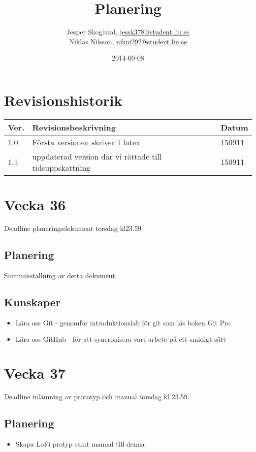 \documentclass{TDP003mall}
\author{Jesper Skoglund, \url{jessk378@student.liu.se}\\
  Niklas Nilsson, \url{nikni292@student.liu.se}}
\title{Planering}
\date{2014-09-08}
\begin{document}
\projectpage
\section{Revisionshistorik}
\begin{table}[!h]
\begin{tabularx}{\linewidth}{|l|X|l|}
\hline
Ver. & Revisionsbeskrivning & Datum \\\hline
1.0 & Första versionen skriven i latex & 150911 \\\hline
1.1 & uppdaterad version där vi rättade till tidsuppskattning & 150911 \\\hline
\end{tabularx}
\end{table}


\section{Vecka 36}
Deadline planeringsdokument torsdag kl23.59\\

\subsection{Planering}
Sammanställning av detta dokument.

\subsection{Kunskaper}

\begin{itemize}
\item Lära oss Git - genomför introduktionslab för git som läs boken Git Pro
\item Lära oss GitHub - för att syncronisera vårt arbete på ett smidigt sätt
\end{itemize}

\section{Vecka 37}
Deadline inlämning av prototyp och manual torsdag kl 23.59.\\

\subsection{Planering}
\begin{itemize}
\item Skapa LoFi protyp samt manual till denna
\end{itemize}
\end{document}
